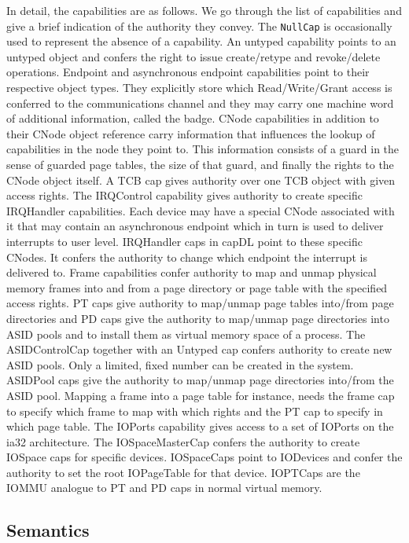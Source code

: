 \documentclass[a4paper,12pt]{article}
\begin{document}
In detail, the capabilities are as follows. We go through the list of 
capabilities and give a brief indication of the authority they convey. The 
\texttt{NullCap} is occasionally used to represent the absence of a capability. 
An untyped capability points to an untyped object and confers the right to 
issue create/retype and revoke/delete operations. Endpoint and asynchronous 
endpoint capabilities point to their respective object types. They explicitly 
store which Read/Write/Grant access is conferred to the communications channel 
and they may carry one machine word of additional information, called the 
badge. CNode capabilities in addition to their CNode object reference carry 
information that influences the lookup of capabilities in the node they point 
to. This information consists of a guard in the sense of guarded page tables, 
the size of that guard, and finally the rights to the CNode object itself. A 
TCB cap gives authority over one TCB object with given access rights. The 
IRQControl capability gives authority to create specific IRQHandler 
capabilities. Each device may have a special CNode associated with it that may 
contain an asynchronous endpoint which in turn is used to deliver interrupts to 
user level. IRQHandler caps in capDL point to these specific CNodes. It confers 
the authority to change which endpoint the interrupt is delivered to. Frame 
capabilities confer authority to map and unmap physical memory frames into and 
from a page directory or page table with the specified access rights. PT caps 
give authority to map/unmap page tables into/from page directories and PD caps 
give the authority to map/unmap page directories into ASID pools and to install 
them as virtual memory space of a process. The ASIDControlCap together with an 
Untyped cap confers authority to create new ASID pools. Only a limited, fixed 
number can be created in the system. ASIDPool caps give the authority to 
map/unmap page directories into/from the ASID pool. Mapping a frame into a page 
table for instance, needs the frame cap to specify which frame to map with 
which rights and the PT cap to specify in which page table. The IOPorts 
capability gives access to a set of IOPorts on the ia32 architecture. The 
IOSpaceMasterCap confers the authority to create IOSpace caps for specific 
devices. IOSpaceCaps point to IODevices and confer the authority to set the 
root IOPageTable for that device. IOPTCaps are the IOMMU analogue to PT and PD 
caps in normal virtual memory.



\subsection{Semantics}
\end{document}
